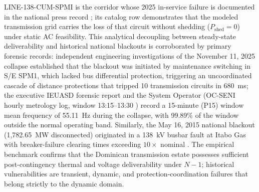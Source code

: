 LINE-138-CUM-SPMI is the corridor whose 2025 in-service failure is documented in the national press record \cite{listin2025}; its catalog row demonstrates that the modeled transmission grid carries the loss of that circuit without shedding ($P_{\mathrm{shed}} = 0$) under static AC feasibility. This analytical decoupling between steady-state deliverability and historical national blackouts is corroborated by primary forensic records: independent engineering investigations of the November 11, 2025 collapse \cite{uasdInformeSPM1_2025} established that the blackout was initiated by maintenance switching in S/E SPM1, which lacked bus differential protection, triggering an uncoordinated cascade of distance protections that tripped 10 transmission circuits in 680~ms; the executive IEUASD forensic report and the System Operator (OC-SENI hourly metrology log, window 13:15--13:30 \cite{ocseniScadaP15_2025}) record a 15-minute (P15) window mean frequency of 55.11~Hz during the collapse, with 99.89\% of the window outside the normal operating band. Similarly, the May 16, 2015 national blackout (1,782.65~MW disconnected) originated in a 138~kV busbar fault at Itabo Gas with breaker-failure clearing times exceeding $10\times$ nominal \cite{listinItaboGas_2015}. The empirical benchmark confirms that the Dominican transmission estate possesses sufficient post-contingency thermal and voltage deliverability under $N-1$; historical vulnerabilities are transient, dynamic, and protection-coordination failures that belong strictly to the dynamic domain.


